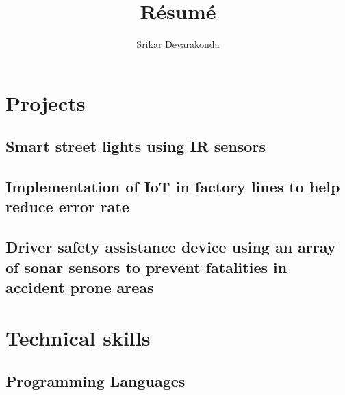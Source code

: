 \documentclass{}
\begin{document}
\title{R\'esum\'e}
\author{Srikar Devarakonda}
\date{}   
\maketitle
    
\section{Projects}
    \subsection{Smart street lights using IR sensors}
    \subsection{Implementation of IoT in factory lines to help reduce error rate}
    \subsection{Driver safety assistance device using an array of sonar sensors to prevent fatalities in accident prone areas}

\section{Technical skills}
    \subsection{Programming Languages}
\end{document}
